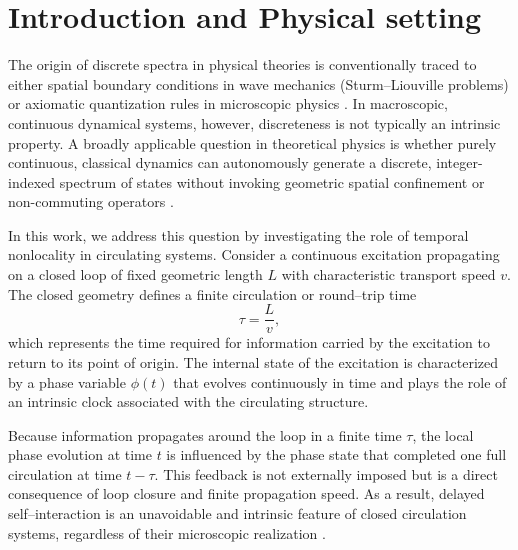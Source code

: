 \documentclass[pdflatex,sn-mathphys-num]{sn-jnl}
\title[\papershorttitle]{\papertitle}
\author{\fnm{Omar} \sur{Iskandarani}}
\begin{document}
    \maketitle



    \section{Introduction and Physical setting}

        The origin of discrete spectra in physical theories is conventionally traced to either spatial boundary conditions in wave mechanics (Sturm--Liouville problems) or axiomatic quantization rules in microscopic physics \cite{Zettl2005,Griffiths2018}. In macroscopic, continuous dynamical systems, however, discreteness is not typically an intrinsic property. A broadly applicable question in theoretical physics is whether purely continuous, classical dynamics can autonomously generate a discrete, integer-indexed spectrum of states without invoking geometric spatial confinement or non-commuting operators \cite{Erneux2009,GlassMackey1988}.

        In this work, we address this question by investigating the role of temporal nonlocality in circulating systems. Consider a continuous excitation propagating on a closed loop of fixed geometric length $L$ with characteristic transport speed $v$. The closed geometry defines a finite circulation or round--trip time
        \begin{equation}
            \tau = \frac{L}{v},
            \label{eq:tau}
        \end{equation}
        which represents the time required for information carried by the excitation to return to its point of origin. The internal state of the excitation is characterized by a phase variable $\phi(t)$ that evolves continuously in time and plays the role of an intrinsic clock associated with the circulating structure.

        Because information propagates around the loop in a finite time $\tau$, the local phase evolution at time $t$ is influenced by the phase state that completed one full circulation at time $t-\tau$. This feedback is not externally imposed but is a direct consequence of loop closure and finite propagation speed. As a result, delayed self--interaction is an unavoidable and intrinsic feature of closed circulation systems, regardless of their microscopic realization \cite{Hale1993,Diekmann1995,Erneux2009}.
\end{document}
